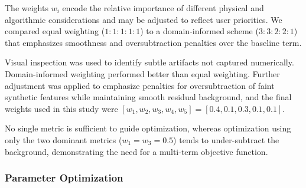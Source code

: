 \documentclass[iucr]{iucrjournals}
\begin{document}
The weights $w_i$ encode the relative importance of different physical and algorithmic considerations and may be adjusted to reflect user priorities. We compared equal weighting ($1\!:\!1\!:\!1\!:\!1\!:\!1$) to a domain-informed scheme ($3\!:\!3\!:\!2\!:\!2\!:\!1$) that emphasizes smoothness and oversubtraction penalties over the baseline term.


Visual inspection was used to identify subtle artifacts not captured numerically. Domain-informed weighting performed better than equal weighting. Further adjustment was applied to emphasize penalties for oversubtraction of faint synthetic features while maintaining smooth residual background, and the final weights used in this study were $[w_1,w_2,w_3,w_4,w_5]=[0.4,0.1,0.3,0.1,0.1]$.


No single metric is sufficient to guide optimization, whereas optimization using only the two dominant metrics ($w_1 = w_3 = 0.5$) tends to under-subtract the background, demonstrating the need for a multi-term objective function.

\subsubsection{Parameter Optimization}

\end{document}
